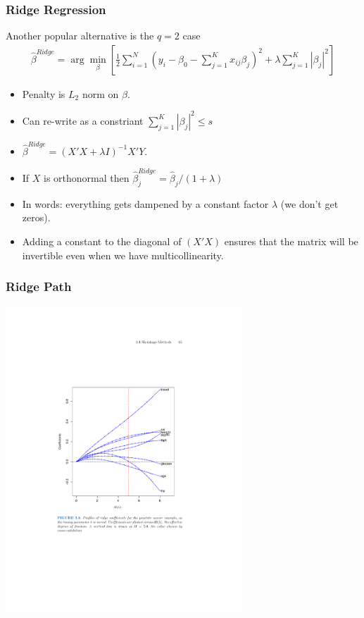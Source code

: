 \documentclass[xcolor=pdftex,dvipsnames,table,mathserif]{beamer}
\begin{document}
\begin{frame}
\frametitle{Ridge Regression}
Another popular alternative is the $q=2$ case
\begin{eqnarray*}
\hat{\beta}^{Ridge} = \arg \min_{\beta} \left[\frac{1}{2} \sum_{i=1}^N (y_i - \beta_0 - \sum_{j=1}^K x_{ij} \beta_j)^2 + \lambda \sum_{j=1}^K | \beta_j|^2 \right]
\end{eqnarray*}
\begin{itemize}
\item Penalty is $L_2$ norm on $\beta$.
\item Can re-write as a constriant  $\sum_{j=1}^K | \beta_j|^2 \leq s$
\item $\hat{\beta}^{Ridge} = (X'X + \lambda I )^{-1} X' Y$.
\item If $X$ is orthonormal then $\hat{\beta}_{j}^{Ridge} =  \hat{\beta}_j /(1 +\lambda )$
\item In words: everything gets dampened by a constant factor $\lambda$ (we don't get zeros).
\item Adding a constant to the diagonal of $(X'X)$ ensures that the matrix will be invertible even when we have multicollinearity.
\end{itemize}
\end{frame}

\begin{frame}
\frametitle{Ridge Path}
\begin{center}
\includegraphics[width=3.5in]{./resources/ridgepath}
\end{center}
\end{frame}
\end{document}
